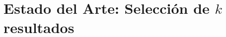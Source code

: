 \documentclass[conference]{IEEEtran}
\begin{document}
\section{Estado del Arte: Selección de $k$ resultados}
\label{sec:soa_top_results}



%

\appendix



\end{document}
